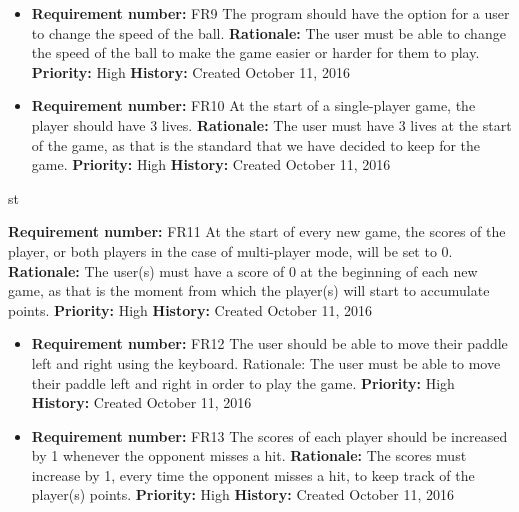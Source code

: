 \documentclass[12pt,letterpaper]{article}
\begin{document}
\begin{reqbox}
	\begin{itemize}
		\item \textbf{Requirement number: }FR9
		The program should have the option for a user to change the speed of the ball.
		\textbf{Rationale: }The user must be able to change the speed of the ball to make the game easier or harder for them to play.
		\textbf{Priority: }High
		\textbf{History: }Created October 11, 2016
	\end{itemize}
\end{reqbox}
\begin{reqbox}
	\begin{itemize}
		\item \textbf{Requirement number: }FR10
		At the start of a single-player game, the player should have 3 lives.
		\textbf{Rationale: }The user must have 3 lives at the start of the game, as that is the standard that we have decided to keep for the game.
		\textbf{Priority: }High
		\textbf{History: }Created October 11, 2016
	\end{itemize}
\end{reqbox}
\begin{reqbox}
	\begin{itemize}
st{
		\item \textbf{Requirement number: }FR11
		At the start of every new game, the scores of the player, or both players in the case of multi-player mode, will be set to 0.
		\textbf{Rationale: }The user(s) must have a score of 0 at the beginning of each new game, as that is the moment from which the player(s) will start to accumulate points.
		\textbf{Priority: }High
		\textbf{History: }Created October 11, 2016
}
	\end{itemize}
\end{reqbox}
\begin{reqbox}
	\begin{itemize}
		\item \textbf{Requirement number: }FR12
		The user should be able to move their paddle left and right using the keyboard.
		Rationale: The user must be able to move their paddle left and right in order to play the game.
		\textbf{Priority: }High
		\textbf{History: }Created October 11, 2016
	\end{itemize}
\end{reqbox}
\begin{reqbox}
	\begin{itemize}
		\item \textbf{Requirement number: }FR13
		The scores of each player should be increased by 1 whenever the opponent misses a hit.
		\textbf{Rationale: }The scores must increase by 1, every time the opponent misses a hit, to keep track of the player(s) points.
		\textbf{Priority: }High
		\textbf{History: }Created October 11, 2016
	\end{itemize}
\end{reqbox}
\end{document}
